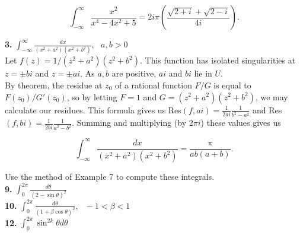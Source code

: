 \documentclass[12pt,letterpaper]{article}
\begin{document}
\[\int_{-\infty}^{\infty} \frac{x^{2}}{x^{4}-4x^{2}+5} = 2i\pi\left(\frac{\sqrt{2+i}+\sqrt{2-i}}{4i}\right).\]

\textbf{3.} \(\int_{-\infty}^{\infty} \frac{dx}{(x^{2}+a^{2})(x^{2}+b^{2})}, \text{ }a,b > 0\)\\

Let \(f(z) = 1/(z^{2}+a^{2})(z^{2}+b^{2})\). This function has isolated singularities at \(z = \pm bi\) and \(z = \pm ai\). As \(a,b\) are positive, \(ai\) and \(bi\) lie in \(U\). \\

By theorem, the residue at \(z_{0}\) of a rational function \(F/G\) is equal to \(F(z_{0})/G'(z_{0})\), so by letting \(F=1\) and \(G=(z^{2}+a^{2})(z^{2}+b^{2})\), we may calculate our residues. This formula gives us Res\((f, ai) = \frac{1}{2ai}\frac{1}{b^{2}-a^{2}}\) and Res\((f, bi) = \frac{1}{2bi}\frac{1}{a^{2}-b^{2}}\). Summing and multiplying (by 2\(\pi i\)) these values gives us

\[\int_{-\infty}^{\infty} \frac{dx}{(x^{2}+a^{2})(x^{2}+b^{2})} = \frac{\pi}{ab(a+b)}.\]

Use the method of Example 7 to compute these integrals. \\

\textbf{9.} \(\int_{0}^{2\pi} \frac{d\theta}{(2-\sin\theta)^{2}}\)\\



\textbf{10.} \(\int_{0}^{2\pi} \frac{d\theta}{(1+\beta\cos\theta)^{2}}, \text{ }-1<\beta<1\) \\



\textbf{12.} \(\int_{0}^{2\pi} \sin^{2k}\theta d\theta\) \\
\end{document}
